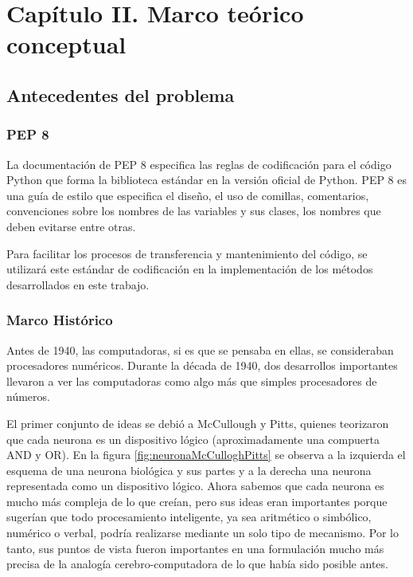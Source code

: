\documentclass[12pt]{article}
\begin{document}
	\newpage
	\section{Capítulo II. Marco teórico conceptual}
		\subsection{Antecedentes del problema}
			\subsubsection{PEP 8}
			La documentación de PEP 8 especifica las reglas de codificación para el código Python que forma la biblioteca estándar en la versión oficial de Python. PEP 8 es una guía de estilo que especifica el diseño, el uso de comillas, comentarios, convenciones sobre los nombres de las variables y sus clases, los nombres que deben evitarse entre otras.\cite{Rossum2001}
			
			Para facilitar los procesos de transferencia y mantenimiento del código, se utilizará este estándar de codificación en la implementación de los métodos desarrollados en este trabajo.
			
			\subsubsection{Marco Histórico}
			Antes de 1940, las computadoras, si es que se pensaba en ellas, se consideraban procesadores numéricos. Durante la década de 1940, dos desarrollos importantes llevaron a ver las computadoras como algo más que simples procesadores de números. \cite{Lehnert2014}
			
			El primer conjunto de ideas se debió a McCullough y Pitts, quienes teorizaron que cada neurona es un dispositivo lógico (aproximadamente una compuerta AND y OR). En la figura \ref{fig:neuronaMcCulloghPitts} se observa a la izquierda el esquema de una neurona biológica y sus partes y a la derecha una neurona representada como un dispositivo lógico. Ahora sabemos que cada neurona es mucho más compleja de lo que creían, pero sus ideas eran importantes porque sugerían que todo procesamiento inteligente, ya sea aritmético o simbólico, numérico o verbal, podría realizarse mediante un solo tipo de mecanismo. Por lo tanto, sus puntos de vista fueron importantes en una formulación mucho más precisa de la analogía cerebro-computadora de lo que había sido posible antes.\cite{Lehnert2014}
					
\end{document}
